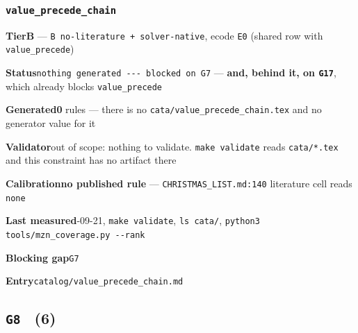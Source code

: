 \documentclass[10pt,a4paper]{article}
\newcommand{\entryfield}[2]{{\raggedright\textbf{#1}\quad #2\par}}
\begin{document}
\subsubsection*{\texttt{value\_\allowbreak{}precede\_\allowbreak{}chain}}
\label{entry:value-precede-chain}
\entryfield{Tier}{\textbf{B} --- \texttt{B no-\allowbreak{}literature + solver-\allowbreak{}native}, ecode \texttt{E0} (shared row with \texttt{value\_precede})}
\entryfield{Status}{\texttt{nothing generated -\allowbreak{}-\allowbreak{}-\allowbreak{} blocked on G7} --- \textbf{and, behind it, on \texttt{G17}}, which already blocks \texttt{value\_precede}}
\entryfield{Generated}{\textbf{0} rules --- there is no \texttt{cata/\allowbreak{}value\_\allowbreak{}precede\_\allowbreak{}chain.\allowbreak{}tex} and no generator value for it}
\entryfield{Validator}{out of scope: nothing to validate. \texttt{make validate} reads \texttt{cata/*.tex} and this constraint has no artifact there}
\entryfield{Calibration}{\textbf{no published rule} --- \texttt{CHRISTMAS\_LIST.md:140} literature cell reads \texttt{none}}
\entryfield{Last measured}{2026-09-21, \texttt{make validate}, \texttt{ls cata/}, \texttt{python3 tools/\allowbreak{}mzn\_\allowbreak{}coverage.\allowbreak{}py -\allowbreak{}-\allowbreak{}rank}}
\entryfield{Blocking gap}{\texttt{G7}}
\entryfield{Entry}{\texttt{catalog/value\_precede\_chain.md}}
\subsection*{\texttt{G8} \ \normalsize(6)}
\end{document}
